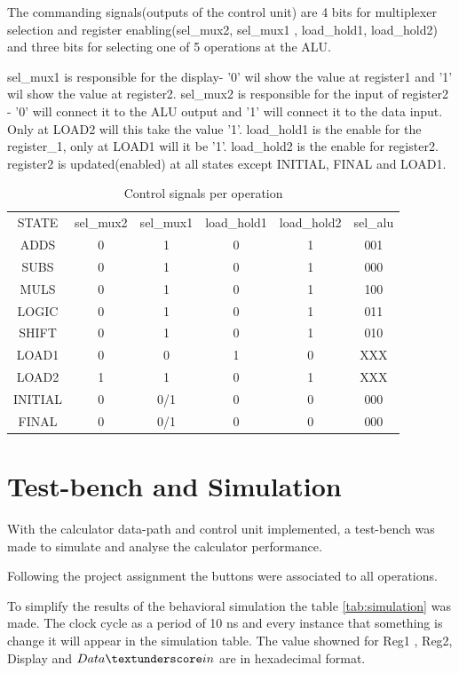 \documentclass[12pt]{article}
\begin{document}
The commanding signals(outputs of the control unit) are 4 bits for multiplexer selection and register enabling(sel\_mux2, sel\_mux1 , load\_hold1, load\_hold2) and three bits for selecting one of 5 operations at the ALU.

sel\_mux1 is responsible for the display- '0' wil show the value at register1 and '1' wil show the value at register2.
sel\_mux2 is responsible for the input of register2 - '0' will connect it to the ALU output and '1' will connect it to the data input. Only at LOAD2 will this take the value '1'. load\_hold1 is the enable for the register\_1, only at LOAD1 will it be '1'. load\_hold2 is the enable for register2. register2 is updated(enabled) at all states except INITIAL, FINAL and LOAD1.


\begin{table}[H]
	\centering
	\begin{tabular}{cccccc}
		STATE & sel\_mux2 & sel\_mux1 & load\_hold1 & load\_hold2 & sel\_alu\\
		ADDS    & 0 & 1 & 0 & 1 & 001\\
		SUBS    & 0 & 1 & 0 & 1 & 000\\
		MULS    & 0 & 1 & 0 & 1 & 100\\
		LOGIC   & 0 & 1 & 0 & 1 & 011\\
		SHIFT   & 0 & 1 & 0 & 1 & 010\\
		LOAD1   & 0 & 0 & 1 & 0 & XXX\\
		LOAD2   & 1 & 1 & 0 & 1 & XXX\\
		INITIAL & 0 & 0/1 & 0 & 0 & 000\\
		FINAL   & 0 & 0/1 & 0 & 0 & 000\\
	\end{tabular}
	\caption{Control signals per operation}
	\label{tab:my_label}
\end{table}


\section{Test-bench and Simulation}
With the calculator data-path and control unit implemented, a test-bench was made to simulate and analyse the calculator performance. 

Following the project assignment the buttons were associated to all operations.

To simplify the results of the behavioral simulation the table \ref{tab:simulation} was made. The clock cycle as a period of 10 ns and every instance that something is change it will appear in the simulation table. The value showned for Reg1 , Reg2, Display and $Data\textunderscore in$ are in hexadecimal format.
\end{document}

